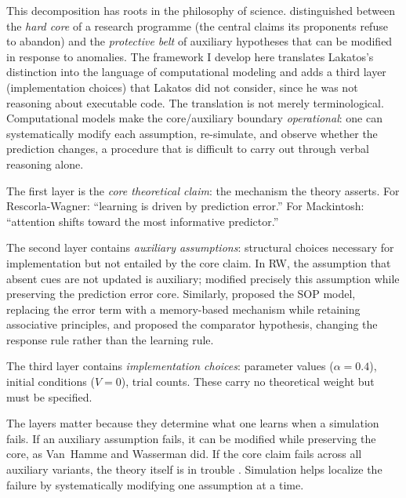 \documentclass[fleqn,10pt]{wlscirep}
\begin{document}
\begin{linenumbers}
This decomposition has roots in the philosophy of science. \citet{lakatos1970falsification} distinguished between the \emph{hard core} of a research programme (the central claims its proponents refuse to abandon) and the \emph{protective belt} of auxiliary hypotheses that can be modified in response to anomalies. The framework I develop here translates Lakatos's distinction into the language of computational modeling and adds a third layer (implementation choices) that Lakatos did not consider, since he was not reasoning about executable code. The translation is not merely terminological. Computational models make the core/auxiliary boundary \emph{operational}: one can systematically modify each assumption, re-simulate, and observe whether the prediction changes, a procedure that is difficult to carry out through verbal reasoning alone.

The first layer is the \emph{core theoretical claim}: the mechanism the theory asserts. For Rescorla-Wagner: ``learning is driven by prediction error.'' For Mackintosh: ``attention shifts toward the most informative predictor.''

The second layer contains \emph{auxiliary assumptions}: structural choices necessary for implementation but not entailed by the core claim. In RW, the assumption that absent cues are not updated is auxiliary; \citet{vanhamme1994cue} modified precisely this assumption while preserving the prediction error core. Similarly, \citet{wagner1981sop} proposed the SOP model, replacing the error term with a memory-based mechanism while retaining associative principles, and \citet{miller1988comparator} proposed the comparator hypothesis, changing the response rule rather than the learning rule.

The third layer contains \emph{implementation choices}: parameter values ($\alpha = 0.4$), initial conditions ($V = 0$), trial counts. These carry no theoretical weight but must be specified.

The layers matter because they determine what one learns when a simulation fails. If an auxiliary assumption fails, it can be modified while preserving the core, as Van~Hamme and Wasserman did. If the core claim fails across all auxiliary variants, the theory itself is in trouble \citep{miller1995assessment}. Simulation helps localize the failure by systematically modifying one assumption at a time.


\end{linenumbers}
\end{document}
